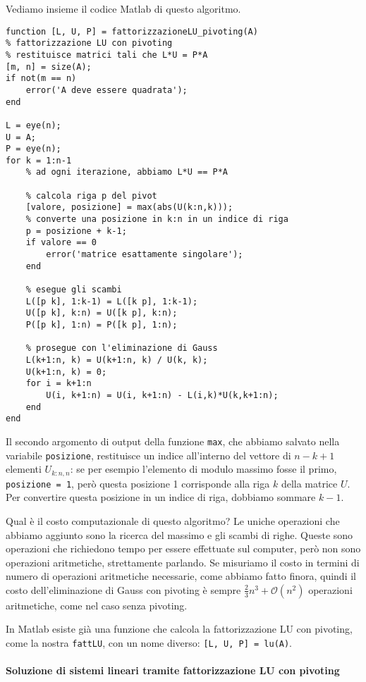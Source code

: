 \documentclass[a4paper]{report}
\theoremstyle{definiton}
\theoremstyle{remark}
\begin{document}
Vediamo insieme il codice Matlab di questo algoritmo.
\begin{lstlisting}
function [L, U, P] = fattorizzazioneLU_pivoting(A)
% fattorizzazione LU con pivoting
% restituisce matrici tali che L*U = P*A
[m, n] = size(A);
if not(m == n)
    error('A deve essere quadrata');
end

L = eye(n);
U = A;
P = eye(n);
for k = 1:n-1
    % ad ogni iterazione, abbiamo L*U == P*A

    % calcola riga p del pivot
    [valore, posizione] = max(abs(U(k:n,k)));
    % converte una posizione in k:n in un indice di riga
    p = posizione + k-1;
    if valore == 0
        error('matrice esattamente singolare');
    end

    % esegue gli scambi
    L([p k], 1:k-1) = L([k p], 1:k-1);
    U([p k], k:n) = U([k p], k:n);
    P([p k], 1:n) = P([k p], 1:n);

    % prosegue con l'eliminazione di Gauss
    L(k+1:n, k) = U(k+1:n, k) / U(k, k);
    U(k+1:n, k) = 0;
    for i = k+1:n
        U(i, k+1:n) = U(i, k+1:n) - L(i,k)*U(k,k+1:n);
    end
end    
\end{lstlisting}
Il secondo argomento di output della funzione \lstinline{max}, che abbiamo salvato nella variabile \lstinline{posizione}, restituisce un indice all'interno del vettore di $n-k+1$ elementi $U_{k:n,n}$: se per esempio l'elemento di modulo massimo fosse il primo, \lstinline{posizione = 1}, però questa posizione 1 corrisponde alla riga $k$ della matrice $U$. Per convertire questa posizione in un indice di riga, dobbiamo sommare $k-1$.

Qual è il costo computazionale di questo algoritmo? Le uniche operazioni che abbiamo aggiunto sono la ricerca del massimo e gli scambi di righe. Queste sono operazioni che richiedono tempo per essere effettuate sul computer, però non sono operazioni aritmetiche, strettamente parlando. Se misuriamo il costo in termini di numero di operazioni aritmetiche necessarie, come abbiamo fatto finora, quindi il costo dell'eliminazione di Gauss con pivoting è sempre  $\frac23 n^3 + \mathcal{O}(n^2)$ operazioni aritmetiche, come nel caso senza pivoting.

In Matlab esiste già una funzione che calcola la fattorizzazione LU con pivoting, come la nostra \lstinline{fattLU}, con un nome diverso: \lstinline{[L, U, P] = lu(A)}.


\paragraph{Soluzione di sistemi lineari tramite fattorizzazione LU con pivoting}
\end{document}

